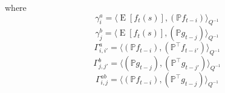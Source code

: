 \documentclass{IEEEtran}
\newcommand{\inner}[3]{\langle#1,#2\rangle_{#3}}
\DeclareMathOperator{\E}{E}
\begin{document}
where
\begin{equation}
	\gamma_i^a = \inner
	{\E[f_t(s)]}
	{(\mathbb{P} f_{t-i})}
	{Q^{-1}}
\end{equation}
\begin{equation}
	\gamma_j^b = \inner
	{\E[f_t(s)]}
	{(\mathbb{P} g_{t-j})}
	{Q^{-1}}
\end{equation}
\begin{equation}
	 \Gamma_{i,i'}^a = \inner
		{(\mathbb{P} f_{t-i})}
		{(\mathbb{P}^\top f_{t-i'})}
		{Q^{-1}}
\end{equation}
\begin{equation}
	\Gamma_{j,j'}^b = \inner
		{(\mathbb{P} g_{t-j})}
		{(\mathbb{P}^\top g_{t-j'})}
		{Q^{-1}}
\end{equation}
\begin{equation}
	\Gamma_{i,j}^{ab} = \inner
		{(\mathbb{P} f_{t-i})}
		{(\mathbb{P}^\top g_{t-j})}
		{Q^{-1}}
\end{equation}
\end{document}
